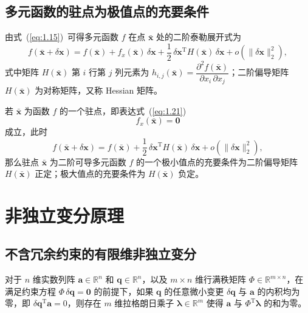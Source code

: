 \subsection{多元函数的驻点为极值点的充要条件}

由式~(\ref{eq:1.15})~可得多元函数 $f$ 在点 $\bar{\boldsymbol{x}}$ 处的二阶泰勒展开式为
\begin{equation}\label{eq:1.22}
f(\bar{\boldsymbol{x}} + \delta\boldsymbol{x}) = f(\bar{\boldsymbol{x}}) + f_x(\bar{\boldsymbol{x}})\,\delta\boldsymbol{x} + \frac{1}{2}\,\delta\boldsymbol{x}^{\mathrm{T}} H(\bar{\boldsymbol{x}})\,\delta\boldsymbol{x} + o\!\left(\|\delta\boldsymbol{x}\|_2^2\right),
\end{equation}
式中矩阵 $H(\bar{\boldsymbol{x}})$ 第 $i$ 行第 $j$ 列元素为 $h_{i,j}(\bar{\boldsymbol{x}}) = \dfrac{\partial^2 f(\bar{\boldsymbol{x}})}{\partial x_i \,\partial x_j}$；二阶偏导矩阵 $H(\bar{\boldsymbol{x}})$ 为对称矩阵，又称 Hessian 矩阵。

若 $\bar{\boldsymbol{x}}$ 为函数 $f$ 的一个驻点，即表达式~(\ref{eq:1.21})
\begin{equation*}
f_x(\bar{\boldsymbol{x}}) = \boldsymbol{0}
\end{equation*}
成立，此时
\begin{equation}\label{eq:1.23}
f(\bar{\boldsymbol{x}} + \delta\boldsymbol{x}) = f(\bar{\boldsymbol{x}}) + \frac{1}{2}\,\delta\boldsymbol{x}^{\mathrm{T}} H(\bar{\boldsymbol{x}})\,\delta\boldsymbol{x} + o\!\left(\|\delta\boldsymbol{x}\|_2^2\right),
\end{equation}
那么驻点 $\bar{\boldsymbol{x}}$ 为二阶可导多元函数 $f$ 的一个极小值点的充要条件为二阶偏导矩阵 $H(\bar{\boldsymbol{x}})$ 正定；极大值点的充要条件为 $H(\bar{\boldsymbol{x}})$ 负定。

\section{非独立变分原理}

\subsection{不含冗余约束的有限维非独立变分}

\begin{theorem}[不含冗余约束的有限维非独立变分原理]
对于 $n$ 维实数列阵 $\boldsymbol{a} \in \mathbb{R}^n$ 和 $\boldsymbol{q} \in \mathbb{R}^n$，以及 $m \times n$ 维行满秩矩阵 $\Phi \in \mathbb{R}^{m \times n}$，在满足约束方程 $\Phi\,\delta\boldsymbol{q} = \boldsymbol{0}$ 的前提下，如果 $\boldsymbol{q}$ 的任意微小变更 $\delta\boldsymbol{q}$ 与 $\boldsymbol{a}$ 的内积均为零，即 $\delta\boldsymbol{q}^{\mathrm{T}} \boldsymbol{a} = 0$，则存在 $m$ 维拉格朗日乘子 $\boldsymbol{\lambda} \in \mathbb{R}^m$ 使得 $\boldsymbol{a}$ 与 $\Phi^{\mathrm{T}} \boldsymbol{\lambda}$ 的和为零。
\end{theorem}

